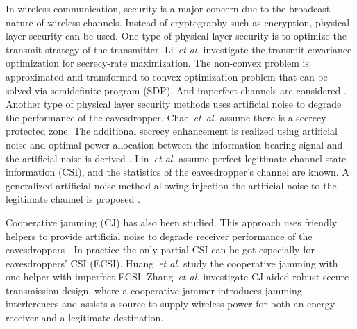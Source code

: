 \documentclass[journal]{IEEEtran}
\begin{document}
In wireless communication, security is a major concern due to the broadcast nature of wireless channels. Instead of cryptography such as encryption, physical layer security can be used.
One type of physical layer security is to optimize the transmit strategy of the transmitter. Li~\emph{et al.} investigate the  transmit covariance optimization for secrecy-rate maximization. The non-convex problem is approximated and transformed to convex optimization problem that can be solved via semidefinite program (SDP). And imperfect channels are considered \cite{li_optimal_2011}.
Another type of physical layer security methods uses artificial noise to degrade the performance of the eavesdropper. Chae~\emph{et~al.} assume there is a secrecy protected zone. The additional secrecy enhancement is realized using artificial noise and optimal power allocation between the information-bearing signal and the artificial noise is derived \cite{chae2014enhanced}.  Lin~\emph{et al.} assume perfect legitimate channel state information (CSI), and the statistics of the eavesdropper's channel are known. A generalized artificial noise method allowing injection the artificial noise to the legitimate channel is proposed \cite{lin2013secrecy}.


Cooperative jamming (CJ) has also been studied. This approach uses friendly helpers to provide artificial noise to degrade receiver performance of the eavesdroppers \cite{cooperative_jamming,huang_cooperative_2011,dong_improving_2010,li_cooperative_2011,zheng_optimal_2011,liao_qos-based_2011}. In practice the only partial CSI can be got especially for eavesdroppers’ CSI (ECSI).  Huang~\emph{et al.} study the cooperative jamming with one helper with imperfect ECSI\cite{huang_robust_2012}. Zhang~\emph{et al.} investigate CJ aided robust secure transmission design, where a cooperative jammer introduces jamming interferences and assists a source to supply wireless power for both an energy receiver and a legitimate destination\cite{Zhang_Cooperative2015}. 
\end{document}
